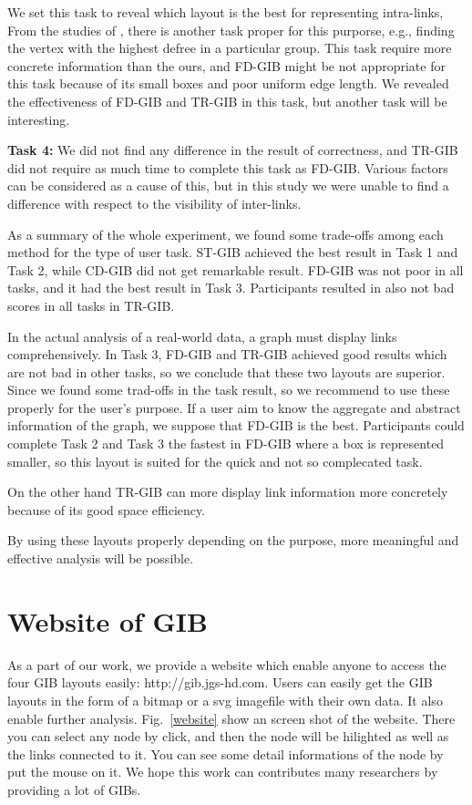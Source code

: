 \documentclass{vgtc}                          %
\begin{document}
We set this task to reveal which layout is the best for representing intra-links, From the studies of \cite{Vehlow2017VisualizingGS,saket2014group}, there is another task proper for this purporse, e.g., finding the vertex with the highest defree in a particular group.
This task require more concrete information than the ours, and FD-GIB might be not appropriate for this task because of its small boxes and poor uniform edge length.
We revealed the effectiveness of FD-GIB and TR-GIB in this task, but another task will be interesting.


{\bf Task 4:} We did not find any difference in the result of correctness, and TR-GIB did not require as much time to complete this task as FD-GIB.
Various factors can be considered as a cause of this, but in this study we were unable to find a difference with respect to the visibility of inter-links.

As a summary of the whole experiment, we found some trade-offs among each method for the type of user task.
ST-GIB achieved the best result in Task 1 and Task 2, while CD-GIB did not get remarkable result.
FD-GIB was not poor in all tasks, and it had the best result in Task 3.
Participants resulted in also not bad scores in all tasks in TR-GIB.

In the actual analysis of a real-world data, a graph must display links comprehensively.
In Task 3, FD-GIB and TR-GIB achieved good results which are not bad in other tasks, so we conclude that these two layouts are superior.
Since we found some trad-offs in the task result, so we recommend to use these properly for the user's purpose.
If a user aim to know the aggregate and abstract information of the graph, we suppose that FD-GIB is the best.
Participants could complete Task 2 and Task 3 the fastest in FD-GIB where a box is represented smaller, so this layout is suited for the quick and not so complecated task.

On the other hand TR-GIB can more display link information more concretely because of its good space efficiency.

By using these layouts properly depending on the purpose, more meaningful and effective analysis will be possible.


\section{Website of GIB}
As a part of our work, we provide a website which enable anyone to access the four GIB layouts easily: http://gib.jgs-hd.com.
Users can easily get the GIB layouts in the form of a bitmap or a svg imagefile with their own data.
It also enable further analysis.
Fig.~\ref{website} show an screen shot of the website.
There you can select any node by click, and then the node will be hilighted as well as the links connected to it.
You can see some detail informations of the node by put the mouse on it.
We hope this work can contributes many researchers by providing a lot of GIBs.
\end{document}
